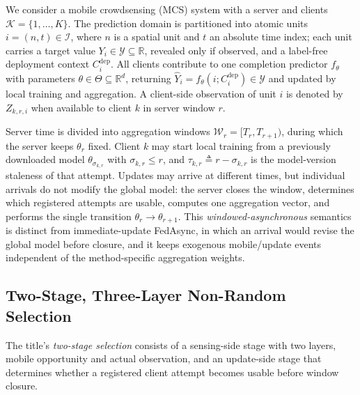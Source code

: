 \documentclass[letterpaper,journal]{IEEEtran}
\begin{document}
We consider a mobile crowdsensing (MCS) system with a server and clients
$\mathcal{K}=\{1,\ldots,K\}$.  The prediction domain is partitioned into atomic
units $i=(n,t)\in\mathcal{I}$, where $n$ is a spatial unit and $t$ an absolute
time index; each unit carries a target value
$Y_i\in\mathcal{Y}\subseteq\mathbb{R}$, revealed only if observed, and a
label-free deployment context $C_i^{\mathrm{dep}}$.  All clients contribute to
one completion predictor $f_{\theta}$ with parameters
$\theta\in\Theta\subseteq\mathbb{R}^{d}$, returning
$\widehat Y_i=f_{\theta}(i;C_i^{\mathrm{dep}})\in\mathcal{Y}$ and updated by
local training and aggregation.  A client-side observation of unit $i$ is
denoted by $Z_{k,r,i}$ when available to client $k$ in server window $r$.

Server time is divided into aggregation windows
$\mathcal{W}_r=[T_r,T_{r+1})$, during which the server keeps $\theta_r$ fixed.
Client $k$ may start local training from a previously downloaded model
$\theta_{\sigma_{k,r}}$ with $\sigma_{k,r}\le r$, and
$\tau_{k,r}\triangleq r-\sigma_{k,r}$ is the model-version staleness of that
attempt.  Updates may arrive at different times, but individual arrivals do not
modify the global model: the server closes the window, determines which
registered attempts are usable, computes one aggregation vector, and performs the
single transition $\theta_r\rightarrow\theta_{r+1}$.  This
\emph{windowed-asynchronous} semantics is distinct from immediate-update
FedAsync, in which an arrival would revise the global model before closure, and
it keeps exogenous mobile/update events independent of the method-specific
aggregation weights.

\subsection{Two-Stage, Three-Layer Non-Random Selection}
\label{subsec:selection_process}

The title's \emph{two-stage selection} consists of a sensing-side stage with two
layers, mobile opportunity and actual observation, and an update-side stage that
determines whether a registered client attempt becomes usable before window
closure.
\end{document}
